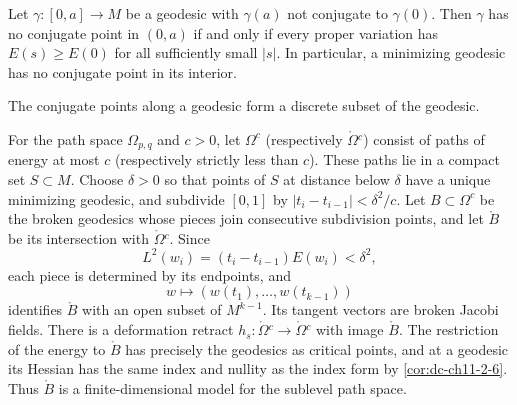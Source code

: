 \begin{corollary}
  \label{cor:dc-ch11-2-9}
  Let $\gamma:[0,a]\to M$ be a geodesic with $\gamma(a)$ not conjugate to
  $\gamma(0)$. Then $\gamma$ has no conjugate point in $(0,a)$ if and only if every
  proper variation has $E(s)\geq E(0)$ for all sufficiently small $|s|$. In
  particular, a minimizing geodesic has no conjugate point in its interior.
\end{corollary}

\begin{corollary}
  \label{cor:dc-ch11-2-10}
  The conjugate points along a geodesic form a discrete subset of the geodesic.
\end{corollary}

\begin{remark}
  \label{rem:dc-ch11-2-12}
  For the path space $\Omega_{p,q}$ and $c>0$, let $\Omega^c$ (respectively
  $\mathring{\Omega}{}^c$) consist of paths of energy at most $c$ (respectively
  strictly less than $c$). These paths lie in a compact set $S\subset M$. Choose
  $\delta>0$ so that points of $S$ at distance below $\delta$ have a unique
  minimizing geodesic, and subdivide $[0,1]$ by
  $|t_i-t_{i-1}|<\delta^2/c$. Let $B\subset\Omega^c$ be the broken geodesics
  whose pieces join consecutive subdivision points, and let $\mathring B$ be its
  intersection with $\mathring{\Omega}{}^c$. Since
  \[
    L^2(w_i)=(t_i-t_{i-1})E(w_i)<\delta^2,
  \]
  each piece is determined by its endpoints, and
  \[
    w\longmapsto(w(t_1),\ldots,w(t_{k-1}))
  \]
  identifies $\mathring B$ with an open subset of $M^{k-1}$. Its tangent vectors
  are broken Jacobi fields. There is a deformation retract
  $h_s:\mathring{\Omega}{}^c\to\mathring{\Omega}{}^c$ with image $\mathring B$.
  The restriction of the energy to $\mathring B$ has precisely the geodesics as
  critical points, and at a geodesic its Hessian has the same index and nullity as
  the index form by \cref{cor:dc-ch11-2-6}. Thus $\mathring B$ is a finite-dimensional
  model for the sublevel path space.
\end{remark}
